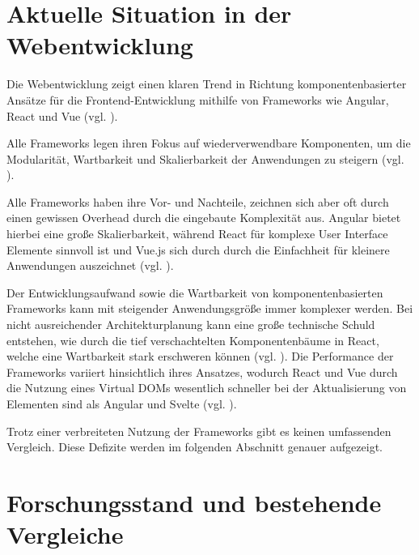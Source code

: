 \documentclass[oneside]{ausarbeitung}
\begin{document}
\section{Aktuelle Situation in der Webentwicklung}
Die Webentwicklung zeigt einen klaren Trend in Richtung komponentenbasierter Ansätze für die Frontend-Entwicklung mithilfe von Frameworks wie Angular, React und Vue (vgl. \parencite[S. 44]{js-framework-comparison}). 

Alle Frameworks legen ihren Fokus auf wiederverwendbare Komponenten, um die Modularität, Wartbarkeit und Skalierbarkeit der Anwendungen zu steigern (vgl. \autocite [S. 7]{spa-frameworks-2024}). 

Alle Frameworks haben ihre Vor- und Nachteile, zeichnen sich aber oft durch einen gewissen Overhead durch die eingebaute Komplexität aus. Angular bietet hierbei eine große Skalierbarkeit, während React für komplexe User Interface Elemente sinnvoll ist und Vue.js sich durch durch die Einfachheit für kleinere Anwendungen auszeichnet (vgl. \parencite[S. 4]{frontend-frameworks-comparison}). 

Der Entwicklungsaufwand sowie die Wartbarkeit von komponentenbasierten Frameworks kann mit steigender Anwendungsgröße immer komplexer werden. Bei nicht ausreichender Architekturplanung kann eine große technische Schuld entstehen, wie durch die tief verschachtelten Komponentenbäume in React, welche eine Wartbarkeit stark erschweren können (vgl. \parencite[S. 29]{comparison-frameworks-scalable-apps}).
Die Performance der Frameworks variiert hinsichtlich ihres Ansatzes, wodurch React und Vue durch die Nutzung eines Virtual DOMs wesentlich schneller bei der Aktualisierung von Elementen sind als Angular und Svelte (vgl. \parencite[S. 61]{js-framework-comparison}).

Trotz einer verbreiteten Nutzung der Frameworks gibt es keinen umfassenden Vergleich. Diese Defizite werden im folgenden Abschnitt genauer aufgezeigt. 

\section{Forschungsstand und bestehende Vergleiche}
\end{document}
